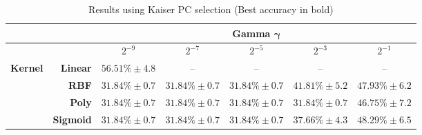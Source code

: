 \documentclass[12pt,a4paper,titlepage,twoside]{report}
\begin{document}
	\begin{table}[h]
		\centering
		\begin{tabular}{|ll|ccccc|}
			\hline
                                      &                                      &   			& \multicolumn{3}{c}{\textbf{Gamma $\boldsymbol{\gamma}$}} &   \\ \hline
                                      &                                      				& $2^{-9}$  		& $2^{-7}$       	& $2^{-5}$      	& $2^{-3}$			& $2^{-1}$ \\ \hline
			\multicolumn{1}{|l|}{\textbf{Kernel}} & \multicolumn{1}{r|}{\textbf{Linear}} 	& \boldmath$56.51\% \pm4.8$ 	& --  	& --				& --	  			& --			   \\
			\multicolumn{1}{|l|}{\textbf{}}       & \multicolumn{1}{r|}{\textbf{RBF}}    	& $31.84\% \pm0.7$ 	& $31.84\% \pm0.7$  & $31.84\% \pm0.7$  & $41.81\% \pm5.2$  & $47.93\% \pm6.2$ \\
			\multicolumn{1}{|l|}{\textbf{}}       & \multicolumn{1}{r|}{\textbf{Poly}}   	& $31.84\% \pm0.7$ 	& $31.84\% \pm0.7$  & $31.84\% \pm0.7$  & $31.84\% \pm0.7$  & $46.75\% \pm7.2$ \\
			\multicolumn{1}{|l|}{\textbf{}}       & \textbf{Sigmoid}                     	& $31.84\% \pm0.7$ 	& $31.84\% \pm0.7$  & $31.84\% \pm0.7$  & $37.66\% \pm4.3$  & $48.29\% \pm6.5$ \\ \hline
		\end{tabular}%
		\caption {Results using Kaiser PC selection (Best accuracy in bold)} 
		\label{tab:kasier-pca-tab}
	\end{table}
	
\end{document}
